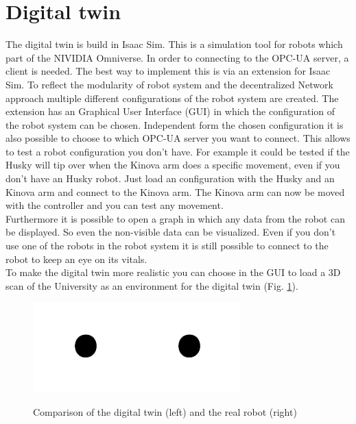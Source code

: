 \documentclass[conference]{IEEEtran}
\begin{document}
\section{Digital twin}
The digital twin is build in Isaac Sim.
This is a simulation tool for robots which part of the NIVIDIA Omniverse.
In order to connecting to the OPC-UA server, a client is needed.
The best way to implement this is via an extension for Isaac Sim.
To reflect the modularity of robot system and the decentralized Network approach multiple different configurations of the robot system are created.
The extension has an Graphical User Interface (GUI) in which the configuration of the robot system can be chosen.
Independent form the chosen configuration it is also possible to choose to which OPC-UA server you want to connect.
This allows to test a robot configuration you don't have. 
For example it could be tested if the Husky will tip over when the Kinova arm does a specific movement, even if you don't have an Husky robot.
Just load an configuration with the Husky and an Kinova arm and connect to the Kinova arm.
The Kinova arm can now be moved with the controller and you can test any movement.\\
Furthermore it is possible to open a graph in which any data from the robot can be displayed.
So even the non-visible data can be visualized.
Even if you don't use one of the robots in the robot system it is still possible to connect to the robot to keep an eye on its vitals.\\
To make the digital twin more realistic you can choose in the GUI to load a 3D scan of the University as an environment for the digital twin (Fig. \ref{fig:CompareDigitalReal}).
\begin{figure}[htbp]
    \centerline{\includegraphics[width=4cm]{Pictures/fig1.png}\includegraphics[width=4cm]{Pictures/fig1.png}}
    \caption{Comparison of the digital twin (left) and the real robot (right)}
    \label{fig:CompareDigitalReal}
\end{figure}
\end{document}
